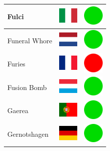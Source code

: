 \documentclass[12pt, a4paper, twoside]{report}
\begin{document}
\begin{center}
\begin{longtable}{|p{5cm}|p{2cm}|p{2cm}|}
 Fulci                                                      & \includegraphics[width=1cm]{4x3/it} &   \includegraphics[width=1cm]{likes/y} \\ \hline
 Funeral Whore                                              & \includegraphics[width=1cm]{4x3/nl} &   \includegraphics[width=1cm]{likes/y} \\ \hline
 Furies                                                     & \includegraphics[width=1cm]{4x3/fr} &   \includegraphics[width=1cm]{likes/n} \\ \hline
 Fusion Bomb                                                & \includegraphics[width=1cm]{4x3/lu} &   \includegraphics[width=1cm]{likes/y} \\ \hline
 Gaerea                                                     & \includegraphics[width=1cm]{4x3/pt} &   \includegraphics[width=1cm]{likes/y} \\ \hline
 Gernotshagen                                               & \includegraphics[width=1cm]{4x3/de} &   \includegraphics[width=1cm]{likes/y} \\ \hline

\end{longtable}
\end{center}
\end{document}
